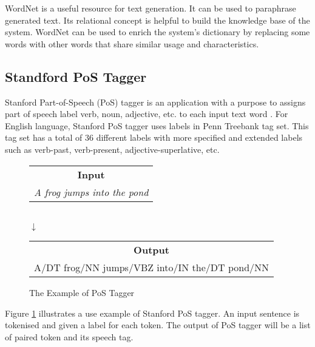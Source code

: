 WordNet is a useful resource for text generation. It can be used to paraphrase generated text. Its relational concept is helpful to build the knowledge base of the system. WordNet can be used to enrich the system's dictionary by replacing some words with other words that share similar usage and characteristics.


\subsection{Standford PoS Tagger}


Stanford Part-of-Speech (PoS) tagger is an application with a purpose to assigns part of speech label verb, noun, adjective, etc. to each input text word \cite{toutanova2003feature}. For English language, Stanford PoS tagger uses labels in Penn Treebank tag set. This tag set has a total of 36 different labels with more specified and extended labels such as verb-past, verb-present, adjective-superlative, etc\cite{marcus1993building}.


\begin{figure}[h]

\centering

\begin{tabular}{c}

\textbf{Input} \\

\textit{A frog jumps into the pond }\\


\end{tabular} 
\\
$\downarrow$
\\

\begin{tabular}{c}

\textbf{Output} \\

A/DT frog/NN jumps/VBZ into/IN the/DT pond/NN \\


\end{tabular} 


\caption{The Example of PoS Tagger}

\label{PoSexample}

\end{figure}


Figure \ref{PoSexample} illustrates a use example of Stanford PoS tagger. An input sentence is tokenised and given a label for each token. The output of PoS tagger will be a list of paired token and its speech tag.


